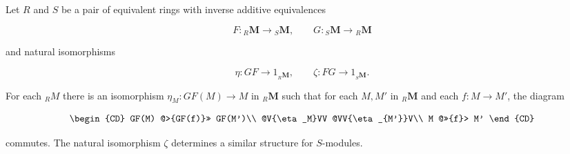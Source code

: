 Let $R$ and $S$ be a pair of equivalent rings with inverse additive equivalences

$$F: {}_R \mathbf{M} \to {}_S \mathbf{M}, \qquad G: {}_S \mathbf{M} \to {}_R \mathbf{M}$$

and natural isomorphisms

$$\eta: GF \to 1_{{}_R \mathbf{M}}, \qquad \zeta: FG \to 1_{{}_S \mathbf{M}}.$$

For each ${}_R M$ there is an isomorphism $\eta_M: GF(M) \to M$ in ${}_R \mathbf{M}$ such that for each $M, M'$ in ${}_R \mathbf{M}$ and each $f: M \to M'$, the diagram

$$\begin{CD}
GF(M) @>{GF(f)}>> GF(M')\\
@V{\eta_M}VV @VV{\eta_{M'}}V\\
M @>>{f}> M'
\end{CD}$$

commutes. The natural isomorphism $\zeta$ determines a similar structure for $S$-modules.
